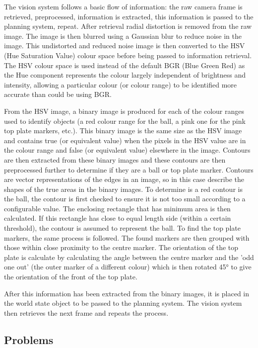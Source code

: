 The vision system follows a basic flow of information: the raw camera frame is retrieved, preprocessed, information is extracted,
this information is passed to the planning system, repeat. After retrieval radial distortion is removed from the raw image. The image
is then blurred using a Gaussian blur to reduce noise in the image. This undistorted and reduced noise image is then converted to the
HSV (Hue Saturation Value) colour space before being passed to information retrieval. The HSV colour space is used instead of the default
BGR (Blue Green Red) as the Hue component represents the colour largely independent of brightness and intensity, allowing a particular colour
(or colour range) to be identified more accurate than could be using BGR.

From the HSV image, a binary image is produced for each of the colour ranges used to identify objects (a red colour range for the ball, a pink one
for the pink top plate markers, etc.). This binary image is the same size as the HSV image and contains true (or equivalent value) when the pixels
in the HSV value are in the colour range and false (or equivalent value) elsewhere in the image. Contours are then extracted from these binary images
and these contours are then preprocessed further to determine if they are a ball or top plate marker. Contours are vector representations of the edges in
an image, so in this case describe the shapes of the true areas in the binary images. To determine is a red contour is the ball, the contour is first
checked to ensure it is not too small according to a configurable value. The enclosing rectangle that has minimum area is then calculated. If this rectangle
has close to equal length side (within a certain threshold), the contour is assumed to represent the ball. To find the top plate markers, the same process is
followed. The found markers are then grouped with those within close proximity to the centre marker. The orientation of the top plate is calculate by calculating
the angle between the centre marker and the 'odd one out' (the outer marker of a different colour) which is then rotated 45° to give the orientation of the
front of the top plate.

After this information has been extracted from the binary images, it is placed in the world state object to be passed to the planning system. The vision system
then retrieves the next frame and repeats the process.



\subsection{Problems}

